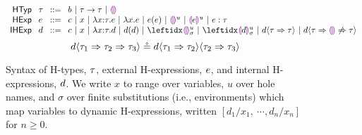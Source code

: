 \begin{figure}[t]
$\arraycolsep=4pt\begin{array}{rllllll}
\mathsf{HTyp} & \htau & ::= &
  b ~\vert~
  \tarr{\htau}{\htau} ~\vert~
  \tehole\\
\mathsf{HExp} & \hexp & ::= &
  c ~\vert~
  x ~\vert~
  \halam{x}{\htau}{\hexp} ~\vert~
      {\hlam{x}{\hexp}} ~\vert~
  \hap{\hexp}{\hexp} ~\vert~
  \hehole{u} ~\vert~
  \hhole{\hexp}{u} ~\vert~
  \hexp : \htau\\
 \mathsf{IHExp} & \dexp  & ::= &
  c ~\vert~
  x ~\vert~
  {\halam{x}{\htau}{\dexp}} ~\vert~
  \hap{\dexp}{\dexp} ~\vert~
  \dehole{\mvar}{\subst}{} ~\vert~
  \dhole{\dexp}{\mvar}{\subst}{} ~\vert~
  \dcasttwo{\dexp}{\htau}{\htau} ~\vert~
  \dcastfail{\dexp}{\htau}{\htau}\\
\end{array}$
$$
d \langle{\tau_1}\Rightarrow{\tau_2}\Rightarrow{\tau_3}\rangle \circeq
  d \langle{\tau_1}\Rightarrow{\tau_2}\rangle \langle{\tau_2}\Rightarrow{\tau_3}\rangle
$$
\vspace{-12px}
\caption{Syntax of H-types, $\tau$, external H-expressions, $e$, and internal H-expressions, $d$.
We write $x$ to range over variables,
$u$ over hole names, and
$\sigma$ over finite substitutions (i.e., environments) which map variables to dynamic H-expressions, written $[d_1/x_1, ~\cdots, d_n/x_n]$ for $n \geq 0$.}
\label{fig:HTyp}
\label{fig:HExp}
\label{fig:hazelnut-live-syntax}
\end{figure}
